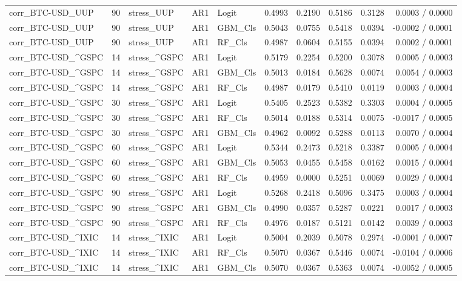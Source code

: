\begin{table}[H]
\begin{tabular}{lllllrrrrr}
corr_BTC-USD_UUP & 90 & stress_UUP & AR1 & Logit & 0.4993 & 0.2190 & 0.5186 & 0.3128 & 0.0003 / 0.0000 \\
corr_BTC-USD_UUP & 90 & stress_UUP & AR1 & GBM_Cls & 0.5043 & 0.0755 & 0.5418 & 0.0394 & -0.0002 / 0.0001 \\
corr_BTC-USD_UUP & 90 & stress_UUP & AR1 & RF_Cls & 0.4987 & 0.0604 & 0.5155 & 0.0394 & 0.0002 / 0.0001 \\
corr_BTC-USD_^GSPC & 14 & stress_^GSPC & AR1 & Logit & 0.5179 & 0.2254 & 0.5200 & 0.3078 & 0.0005 / 0.0003 \\
corr_BTC-USD_^GSPC & 14 & stress_^GSPC & AR1 & GBM_Cls & 0.5013 & 0.0184 & 0.5628 & 0.0074 & 0.0054 / 0.0003 \\
corr_BTC-USD_^GSPC & 14 & stress_^GSPC & AR1 & RF_Cls & 0.4987 & 0.0179 & 0.5410 & 0.0119 & 0.0003 / 0.0004 \\
corr_BTC-USD_^GSPC & 30 & stress_^GSPC & AR1 & Logit & 0.5405 & 0.2523 & 0.5382 & 0.3303 & 0.0004 / 0.0005 \\
corr_BTC-USD_^GSPC & 30 & stress_^GSPC & AR1 & RF_Cls & 0.5014 & 0.0188 & 0.5314 & 0.0075 & -0.0017 / 0.0005 \\
corr_BTC-USD_^GSPC & 30 & stress_^GSPC & AR1 & GBM_Cls & 0.4962 & 0.0092 & 0.5288 & 0.0113 & 0.0070 / 0.0004 \\
corr_BTC-USD_^GSPC & 60 & stress_^GSPC & AR1 & Logit & 0.5344 & 0.2473 & 0.5218 & 0.3387 & 0.0005 / 0.0004 \\
corr_BTC-USD_^GSPC & 60 & stress_^GSPC & AR1 & GBM_Cls & 0.5053 & 0.0455 & 0.5458 & 0.0162 & 0.0015 / 0.0004 \\
corr_BTC-USD_^GSPC & 60 & stress_^GSPC & AR1 & RF_Cls & 0.4959 & 0.0000 & 0.5251 & 0.0069 & 0.0029 / 0.0004 \\
corr_BTC-USD_^GSPC & 90 & stress_^GSPC & AR1 & Logit & 0.5268 & 0.2418 & 0.5096 & 0.3475 & 0.0003 / 0.0004 \\
corr_BTC-USD_^GSPC & 90 & stress_^GSPC & AR1 & GBM_Cls & 0.4990 & 0.0357 & 0.5287 & 0.0221 & 0.0017 / 0.0003 \\
corr_BTC-USD_^GSPC & 90 & stress_^GSPC & AR1 & RF_Cls & 0.4976 & 0.0187 & 0.5121 & 0.0142 & 0.0039 / 0.0003 \\
corr_BTC-USD_^IXIC & 14 & stress_^IXIC & AR1 & Logit & 0.5004 & 0.2039 & 0.5078 & 0.2974 & -0.0001 / 0.0007 \\
corr_BTC-USD_^IXIC & 14 & stress_^IXIC & AR1 & RF_Cls & 0.5070 & 0.0367 & 0.5446 & 0.0074 & -0.0104 / 0.0006 \\
corr_BTC-USD_^IXIC & 14 & stress_^IXIC & AR1 & GBM_Cls & 0.5070 & 0.0367 & 0.5363 & 0.0074 & -0.0052 / 0.0005 \\

\end{tabular}
\end{table}
